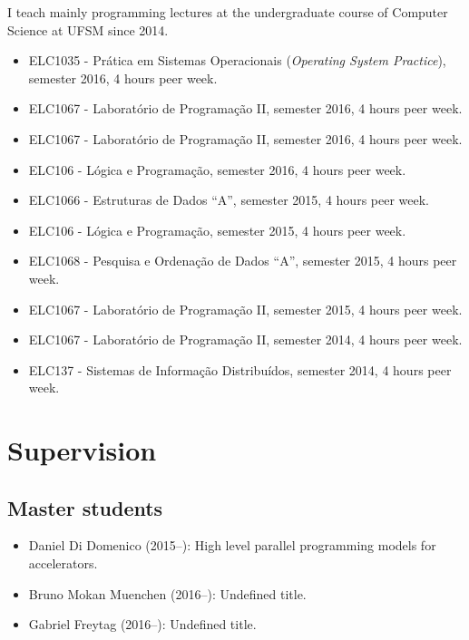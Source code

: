\documentclass[11pt,a4paper]{article}
\begin{document}
I teach mainly programming lectures at the undergraduate course of Computer
Science at UFSM since 2014.
\begin{itemize}
\item ELC1035 - Prática em Sistemas Operacionais (\emph{Operating
    System Practice}),  semester 2016, 4 hours peer week.
\item ELC1067 - Laboratório de Programação II,  semester 2016, 4 hours peer week.
\item ELC1067 - Laboratório de Programação II,  semester 2016, 4 hours peer week.
\item ELC106 - Lógica e Programação,  semester 2016, 4 hours peer week.
\item ELC1066 - Estruturas de Dados ``A'',  semester 2015, 4 hours peer week.
\item ELC106 - Lógica e Programação,  semester 2015, 4 hours peer week.
\item ELC1068 - Pesquisa e Ordenação de Dados ``A'',  semester 2015, 4 hours peer week. 
\item ELC1067 - Laboratório de Programação II,  semester 2015, 4 hours peer week.
\item ELC1067 - Laboratório de Programação II,  semester 2014, 4 hours peer week.
\item ELC137 - Sistemas de Informação Distribuídos,  semester 2014, 4 hours peer week.
\end{itemize}

\section{Supervision}

\subsection{Master students}

\begin{itemize} \itemsep -2pt
\item Daniel Di Domenico (2015--): High level parallel programming models for accelerators.
\item Bruno Mokan Muenchen (2016--): Undefined title.
\item Gabriel Freytag (2016--): Undefined title.
\end{itemize}
\end{document}
